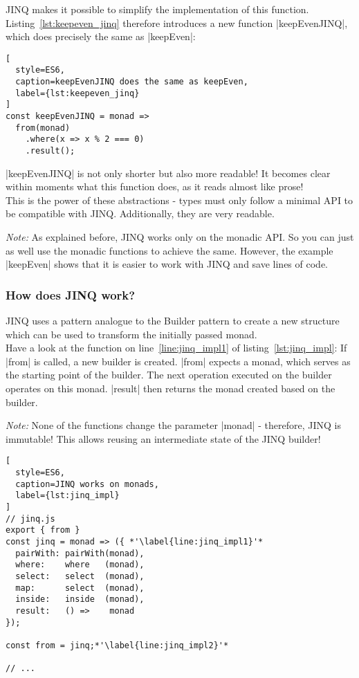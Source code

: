 JINQ makes it possible to simplify the implementation of this function.
Listing~\ref{lst:keepeven_jinq} therefore introduces a new function
|keepEvenJINQ|, which does precisely the same as |keepEven|:

\begin{lstlisting}[
  style=ES6,
  caption=keepEvenJINQ does the same as keepEven,
  label={lst:keepeven_jinq}
]
const keepEvenJINQ = monad =>
  from(monad)
    .where(x => x % 2 === 0)
    .result();
\end{lstlisting}

|keepEvenJINQ| is not only shorter but also more readable! It becomes clear
within moments what this function does, as it reads almost like prose!\\
This is the power of these abstractions - types must only follow a
minimal API to be compatible with JINQ. Additionally, they are very readable.

\textit{Note:} As explained before, JINQ works only on the monadic API. So you
can just as well use the monadic functions to achieve the same. However, the
example |keepEven| shows that it is easier to work with JINQ and save lines of
code.

\subsubsection{How does JINQ work?} %
\label{subsub:How does JINQ work?}
JINQ uses a pattern analogue to the Builder pattern
\cite[Ch.~3.2]{gang_of_four_depa} to create a new structure which can be
used to transform the initially passed monad. \\
Have a look at the function on line~\ref{line:jinq_impl1} of
listing~\ref{lst:jinq_impl}: If |from| is called, a new builder is created.
|from| expects a monad, which serves as the starting point of the builder. The
next operation executed on the builder operates on this monad. |result| then
returns the monad created based on the builder.

\textit{Note:} None of the functions change the parameter |monad| - therefore,
JINQ is immutable! This allows reusing an intermediate state of the JINQ
builder!

\begin{lstlisting}[
  style=ES6,
  caption=JINQ works on monads,
  label={lst:jinq_impl}
]
// jinq.js
export { from }
const jinq = monad => ({ *'\label{line:jinq_impl1}'*
  pairWith: pairWith(monad),
  where:    where   (monad),
  select:   select  (monad),
  map:      select  (monad),
  inside:   inside  (monad),
  result:   () =>    monad
});

const from = jinq;*'\label{line:jinq_impl2}'*

// ...
\end{lstlisting}

